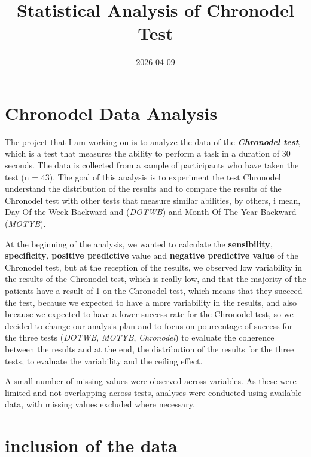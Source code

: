 \documentclass[
]{article}
\title{Statistical Analysis of Chronodel Test}
\author{}
\date{\vspace{-2.5em}2026-04-09}
\begin{document}
\maketitle

{
\setcounter{tocdepth}{2}
\tableofcontents
}
\section{Chronodel Data Analysis}\label{chronodel-data-analysis}

The project that I am working on is to analyze the data of the
\textbf{\emph{Chronodel test}}, which is a test that measures the
ability to perform a task in a duration of 30 seconds. The data is
collected from a sample of participants who have taken the test (n =
43). The goal of this analysis is to experiment the test Chronodel
understand the distribution of the results and to compare the results of
the Chronodel test with other tests that measure similar abilities, by
others, i mean, Day Of the Week Backward and (\emph{DOTWB}) and Month Of
The Year Backward (\emph{MOTYB}).

At the beginning of the analysis, we wanted to calculate the
\textbf{sensibility}, \textbf{specificity}, \textbf{positive predictive}
value and \textbf{negative predictive value} of the Chronodel test, but
at the reception of the results, we observed low variability in the
results of the Chronodel test, which is really low, and that the
majority of the patients have a result of 1 on the Chronodel test, which
means that they succeed the test, because we expected to have a more
variability in the results, and also because we expected to have a lower
success rate for the Chronodel test, so we decided to change our
analysis plan and to focus on pourcentage of success for the three tests
(\emph{DOTWB}, \emph{MOTYB}, \emph{Chronodel}) to evaluate the coherence
between the results and at the end, the distribution of the results for
the three tests, to evaluate the variability and the ceiling effect.

A small number of missing values were observed across variables. As
these were limited and not overlapping across tests, analyses were
conducted using available data, with missing values excluded where
necessary.

\section{inclusion of the data}\label{inclusion-of-the-data}
\end{document}
